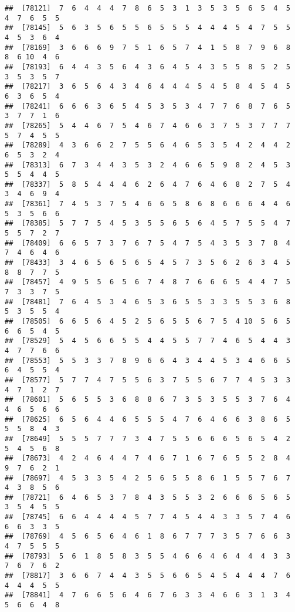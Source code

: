 \documentclass[
]{book}
\begin{document}
\begin{verbatim}
##  [78121]  7  6  4  4  4  7  8  6  5  3  1  3  5  3  5  6  5  4  5  4  7  6  5  5
##  [78145]  5  6  3  5  6  5  5  6  5  5  5  4  4  4  5  4  7  5  5  4  5  3  6  4
##  [78169]  3  6  6  6  9  7  5  1  6  5  7  4  1  5  8  7  9  6  8  8  6 10  4  6
##  [78193]  6  4  4  3  5  6  4  3  6  4  5  4  3  5  5  8  5  2  5  3  5  3  5  7
##  [78217]  3  6  5  6  4  3  4  6  4  4  4  5  4  5  8  4  5  4  5  6  3  6  5  4
##  [78241]  6  6  6  3  6  5  4  5  3  5  3  4  7  7  6  8  7  6  5  3  7  7  1  6
##  [78265]  5  4  4  6  7  5  4  6  7  4  6  6  3  7  5  3  7  7  7  5  7  4  5  5
##  [78289]  4  3  6  6  2  7  5  5  6  4  6  5  3  5  4  2  4  4  2  6  5  3  2  4
##  [78313]  6  7  3  4  4  3  5  3  2  4  6  6  5  9  8  2  4  5  3  5  5  4  4  5
##  [78337]  5  8  5  4  4  4  6  2  6  4  7  6  4  6  8  2  7  5  4  3  4  6  9  4
##  [78361]  7  4  5  3  7  5  4  6  6  5  8  6  8  6  6  6  4  4  6  5  3  5  6  6
##  [78385]  5  7  7  5  4  5  3  5  5  6  5  6  4  5  7  5  5  4  7  5  5  7  2  7
##  [78409]  6  6  5  7  3  7  6  7  5  4  7  5  4  3  5  3  7  8  4  7  4  6  4  6
##  [78433]  3  4  6  5  6  5  6  5  4  5  7  3  5  6  2  6  3  4  5  8  8  7  7  5
##  [78457]  4  9  5  5  6  5  6  7  4  8  7  6  6  6  5  4  4  7  5  7  3  3  7  5
##  [78481]  7  6  4  5  3  4  6  5  3  6  5  5  3  3  5  5  3  6  8  5  3  5  5  4
##  [78505]  6  6  5  6  4  5  2  5  6  5  5  6  7  5  4 10  5  6  5  6  6  5  4  5
##  [78529]  5  4  5  6  6  5  5  4  4  5  5  7  7  4  6  5  4  4  3  4  7  7  6  6
##  [78553]  5  5  3  3  7  8  9  6  6  4  3  4  4  5  3  4  6  6  5  6  4  5  5  4
##  [78577]  5  7  7  4  7  5  5  6  3  7  5  5  6  7  7  4  5  3  3  4  7  1  2  7
##  [78601]  5  6  5  5  3  6  8  8  6  7  3  5  3  5  5  3  7  6  4  4  6  5  6  6
##  [78625]  6  5  6  4  4  6  5  5  5  4  7  6  4  6  6  3  8  6  5  5  5  8  4  3
##  [78649]  5  5  5  7  7  7  3  4  7  5  5  6  6  6  5  6  5  4  2  5  4  5  6  8
##  [78673]  4  2  4  6  4  4  7  4  6  7  1  6  7  6  5  5  2  8  4  9  7  6  2  1
##  [78697]  4  5  3  3  5  4  2  5  6  5  5  8  6  1  5  5  7  6  7  4  3  8  5  6
##  [78721]  6  4  6  5  3  7  8  4  3  5  5  3  2  6  6  6  5  6  5  3  5  4  5  5
##  [78745]  6  6  4  4  4  4  5  7  7  4  5  4  4  3  3  5  7  4  6  6  6  3  3  5
##  [78769]  4  5  6  5  6  4  6  1  8  6  7  7  7  3  5  7  6  6  3  4  7  5  5  5
##  [78793]  5  6  1  8  5  8  3  5  5  4  6  6  4  6  4  4  4  3  3  7  6  7  6  2
##  [78817]  3  6  6  7  4  4  3  5  5  6  6  5  4  5  4  4  4  7  6  4  4  4  5  5
##  [78841]  4  7  6  6  5  6  4  6  7  6  3  3  4  6  6  3  1  3  4  5  6  6  4  8

\end{verbatim}
\end{document}
